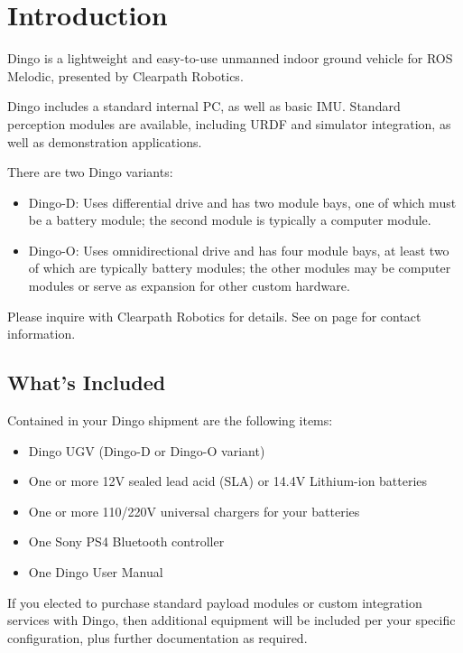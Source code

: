 \documentclass[]{clearpath-latex/clearpath-manual}
\begin{document}
\tableofcontents

\section{Introduction}

Dingo is a lightweight and easy-to-use unmanned indoor ground vehicle for ROS
Melodic, presented by Clearpath Robotics.

Dingo includes a standard internal PC, as well as basic IMU. Standard
perception modules are available, including URDF and simulator integration, as well as demonstration applications.

There are two Dingo variants:
\begin{itemize}[nolistsep]
	\item Dingo-D: Uses differential drive and has two module bays, one of which must be a battery module; the second module is typically a computer module.
	\item Dingo-O: Uses omnidirectional drive and has four module bays, at least two of which are typically battery modules; the other modules may be computer modules or serve as expansion for other custom hardware.
\end{itemize}

Please inquire with Clearpath Robotics for details. See  on page
\pageref{contact} for contact information.

\subsection{What's Included}

Contained in your Dingo shipment are the following items:

\begin{itemize}[nolistsep]
  \item Dingo UGV (Dingo-D or Dingo-O variant)
  \item One or more 12V sealed lead acid (SLA) or 14.4V Lithium-ion batteries
  \item One or more 110/220V universal chargers for your batteries
  \item One Sony PS4 Bluetooth controller
  \item One Dingo User Manual
\end{itemize}

If you elected to purchase standard payload modules or custom integration services with
Dingo, then additional equipment will be included per your specific configuration, plus
further documentation as required.
\end{document}
